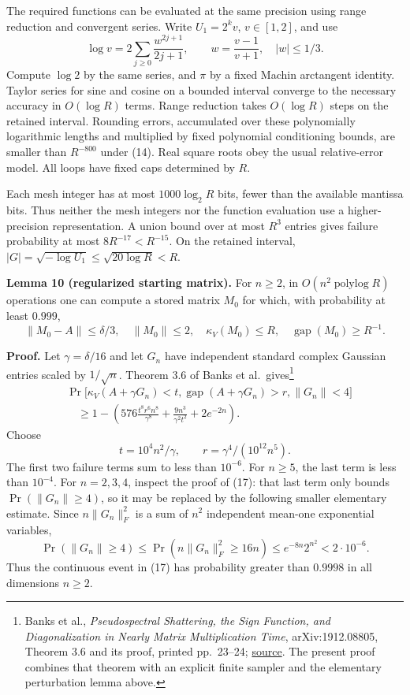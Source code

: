 \documentclass[10pt,a4paper]{article}
\begin{document}
The required functions can be evaluated at the same precision using
range reduction and convergent series. Write \(U_1=2^kv\),
\(v\in[1,2]\), and use \[
 \log v=2\sum_{j\ge0}\frac{w^{2j+1}}{2j+1},\qquad
 w=\frac{v-1}{v+1},\quad |w|\le1/3.
\] Compute \(\log2\) by the same series, and \(\pi\) by a fixed Machin
arctangent identity. Taylor series for sine and cosine on a bounded
interval converge to the necessary accuracy in \(O(\log R)\) terms.
Range reduction takes \(O(\log R)\) steps on the retained interval.
Rounding errors, accumulated over these polynomially logarithmic lengths
and multiplied by fixed polynomial conditioning bounds, are smaller than
\(R^{-800}\) under (14). Real square roots obey the usual relative-error
model. All loops have fixed caps determined by \(R\).

Each mesh integer has at most \(1000\log_2 R\) bits, fewer than the
available mantissa bits. Thus neither the mesh integers nor the function
evaluation use a higher-precision representation. A union bound over at
most \(R^3\) entries gives failure probability at most
\(8R^{-17}<R^{-15}\). On the retained interval,
\(|G|=\sqrt{-\log U_1}\le\sqrt{20\log R}<R\).

\textbf{Lemma 10 (regularized starting matrix).} For \(n\ge2\), in
\(O(n^2\operatorname{polylog}R)\) operations one can compute a stored
matrix \(M_0\) for which, with probability at least \(0.999\), \[
 \|M_0-A\|\le\delta/3,
 \quad \|M_0\|\le2,
 \quad \kappa_V(M_0)\le R,
 \quad \operatorname{gap}(M_0)\ge R^{-1}.
 \tag{16}
\]

\textbf{Proof.} Let \(\gamma=\delta/16\) and let \(G_n\) have
independent standard complex Gaussian entries scaled by \(1/\sqrt n\).
Theorem 3.6 of Banks et al.~gives\footnote{Banks et al.,
  \emph{Pseudospectral Shattering, the Sign Function, and
  Diagonalization in Nearly Matrix Multiplication Time},
  arXiv:1912.08805, Theorem 3.6 and its proof, printed pp.~23--24;
  \href{https://arxiv.org/pdf/1912.08805}{source}. The present proof
  combines that theorem with an explicit finite sampler and the
  elementary perturbation lemma above.} \[
 \begin{aligned}
 &\Pr\bigl[\kappa_V(A+\gamma G_n)<t,
      \operatorname{gap}(A+\gamma G_n)>r,
      \|G_n\|<4\bigr]\\
 &\quad\ge1-
 \left(576\frac{t^8r^6n^8}{\gamma^8}
       +\frac{9n^3}{\gamma^2t^2}+2e^{-2n}\right).
 \end{aligned}
 \tag{17}
\] Choose \[
 t=10^4n^2/\gamma,
 \qquad r=\gamma^4/(10^{12}n^5).
\] The first two failure terms sum to less than \(10^{-6}\). For
\(n\ge5\), the last term is less than \(10^{-4}\). For \(n=2,3,4\),
inspect the proof of (17): that last term only bounds
\(\Pr(\|G_n\|\ge4)\), so it may be replaced by the following smaller
elementary estimate. Since \(n\|G_n\|_F^2\) is a sum of \(n^2\)
independent mean-one exponential variables, \[
 \Pr(\|G_n\|\ge4)
 \le \Pr(n\|G_n\|_F^2\ge16n)
 \le e^{-8n}2^{n^2}<2\cdot10^{-6}.
\] Thus the continuous event in (17) has probability greater than
\(0.9998\) in all dimensions \(n\ge2\).
\end{document}
